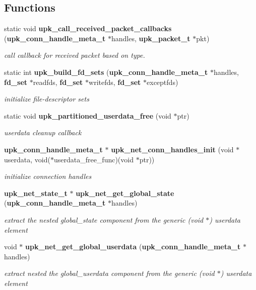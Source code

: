 \subsection*{Functions}
\begin{DoxyCompactItemize}
\item 
static void {\bf upk\_\-call\_\-received\_\-packet\_\-callbacks} ({\bf upk\_\-conn\_\-handle\_\-meta\_\-t} $\ast$handles, {\bf upk\_\-packet\_\-t} $\ast$pkt)
\begin{DoxyCompactList}\small\item\em call callback for received packet based on type. \end{DoxyCompactList}\item 
static int {\bf upk\_\-build\_\-fd\_\-sets} ({\bf upk\_\-conn\_\-handle\_\-meta\_\-t} $\ast$handles, {\bf fd\_\-set} $\ast$readfds, {\bf fd\_\-set} $\ast$writefds, {\bf fd\_\-set} $\ast$exceptfds)
\begin{DoxyCompactList}\small\item\em initialize file-\/descriptor sets \end{DoxyCompactList}\item 
static void {\bf upk\_\-partitioned\_\-userdata\_\-free} (void $\ast$ptr)
\begin{DoxyCompactList}\small\item\em userdata cleanup callback \end{DoxyCompactList}\item 
{\bf upk\_\-conn\_\-handle\_\-meta\_\-t} $\ast$ {\bf upk\_\-net\_\-conn\_\-handles\_\-init} (void $\ast$userdata, void($\ast$userdata\_\-free\_\-func)(void $\ast$ptr))
\begin{DoxyCompactList}\small\item\em initialize connection handles \end{DoxyCompactList}\item 
{\bf upk\_\-net\_\-state\_\-t} $\ast$ {\bf upk\_\-net\_\-get\_\-global\_\-state} ({\bf upk\_\-conn\_\-handle\_\-meta\_\-t} $\ast$handles)
\begin{DoxyCompactList}\small\item\em extract the nested global\_\-state component from the generic (void $\ast$) userdata element \end{DoxyCompactList}\item 
void $\ast$ {\bf upk\_\-net\_\-get\_\-global\_\-userdata} ({\bf upk\_\-conn\_\-handle\_\-meta\_\-t} $\ast$handles)
\begin{DoxyCompactList}\small\item\em extract nested the global\_\-userdata component from the generic (void $\ast$) userdata element \end{DoxyCompactList}\item 

\end{DoxyCompactItemize}
